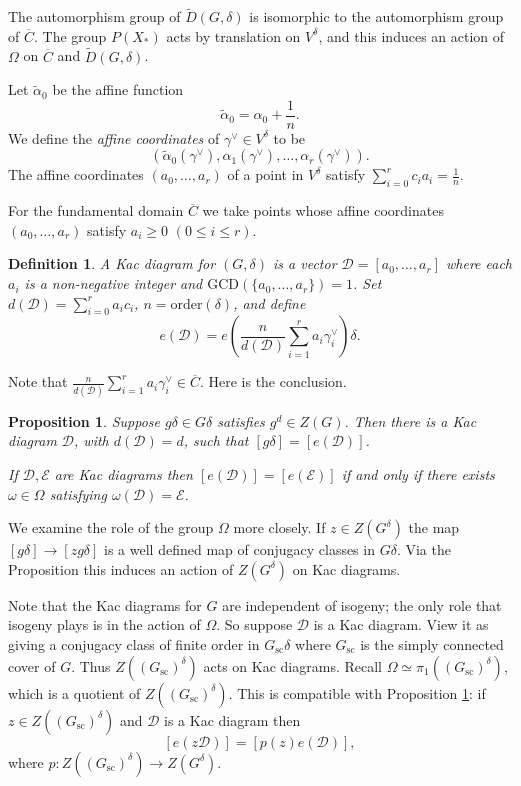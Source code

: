 \documentclass[10pt,leqno]{article}
\newtheorem{definition}[equation]{Definition}
\newtheorem{proposition}[equation]{Proposition}
\newcommand{\D}{\mathcal D}
\newcommand{\Gsc}{G_{\text{sc}}}
\newcommand{\ch}[1]{#1^\vee}
\newcommand\wt{\widetilde}
\newcommand{\Daffine}{\wt D(G,\delta)}
\def\ge{\geqslant}
\def\le{\leqslant}
\begin{document}
The automorphism group of $\Daffine$ is isomorphic to the
automorphism group of $\overline C$. The group $P(X_*)$ acts by
translation on $V^\delta$, and this induces an action of $\Omega$ on
$\overline C$ and $\Daffine$.



Let $\wt\alpha_0$ be the affine function
$$
\wt\alpha_0=\alpha_0+\frac1n.
$$
We define the {\it affine coordinates} of  $\ch\gamma\in V^\delta$ to be
$$
(\wt\alpha_0(\ch\gamma),\alpha_1(\ch\gamma),\dots, \alpha_r(\ch\gamma)).
$$
The affine coordinates $(a_0,\dots, a_r)$ of a point  in $V^\delta$ satisfy
$\sum_{i=0}^r c_ia_i=\frac1n$.

For the fundamental domain $\overline C$ we take
points whose affine coordinates $(a_0,\dots, a_r)$ satisfy $a_i\ge 0$ $(0\le i\le r)$.


\begin{definition}
A Kac diagram for $(G,\delta)$ is a vector $\mathcal D=[a_0,\dots, a_r]$ where
each $a_i$ is a non-negative integer and $\text{GCD}(\{a_0,\dots, a_r\})=1$.
Set $d(\D)=\sum_{i=0}^r a_ic_i$, $n=\text{order}(\delta)$, and define
$$
e(\D)= e(\frac n{d(\D)}\sum_{i=1}^r a_i\ch\gamma_i)\delta.
$$
\end{definition}
Note that $\frac n{d(\D)}\sum_{i=1}^r a_i\ch\gamma_i\in \overline C$.
Here is the conclusion.


\begin{proposition}
  \label{p:kac}
Suppose $g\delta\in G\delta$ satisfies $g^d\in Z(G)$. Then there is a Kac diagram $\D$,
with $d(\D)=d$, such that $[g\delta]=[e(\D)]$.

If $\D,\mathcal E$ are Kac diagrams then $[e(\D)]=[e(\mathcal E)]$ if and only if
there exists $\omega\in \Omega$ satisfying $\omega(\D)=\mathcal E$.
\end{proposition}

We examine the role of the group $\Omega$ more closely.  If
$z\in Z(G^\delta)$ the map $[g\delta]\rightarrow [zg\delta]$ is a well
defined map of conjugacy classes in $G\delta$. Via the Proposition
this induces an action of $Z(G^\delta)$ on Kac diagrams.

Note that the Kac diagrams for $G$ are independent of isogeny; the
only role that isogeny plays is in the action of $\Omega$.  So suppose
$\D$ is a Kac diagram. View it as giving a conjugacy class of finite
order in $\Gsc\delta$ where $\Gsc$ is the simply connected cover of
$G$.  Thus $Z((\Gsc)^\delta)$ acts on Kac diagrams. Recall
$\Omega\simeq \pi_1((\Gsc)^\delta)$, which is a quotient of
$Z((\Gsc)^\delta)$.
This is compatible with Proposition \ref{p:kac}: if $z\in Z((\Gsc)^\delta)$ and $\D$ is a Kac diagram then
$$
[e(z\D)] = [p(z)e(\D)],
$$
where $p:Z((\Gsc)^\delta)\rightarrow Z(G^\delta)$. 
\end{document}
